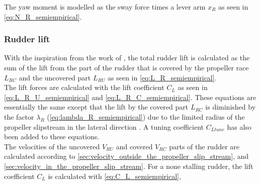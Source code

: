 The yaw moment is modelled as the sway force times a lever arm $x_R$ as seen in \autoref{eq:N_R_semiempirical}.
\begin{equation}
    \label{eq:N_R_semiempirical}
    
\end{equation}
%
%
\subsubsection{Rudder lift}
\label{sec:rudder lift}
With the inspiration from the work of \citet{villa_numerical_2020}, the total rudder lift is calculated as the sum of the lift from the part of the rudder that is covered by the propeller race $L_{RC}$ and the uncovered part $L_{RU}$ as seen in \autoref{eq:L_R_semiempirical}.
\begin{equation}
    \label{eq:L_R_semiempirical}
    
\end{equation}
The lift forces are calculated with the lift coefficient $C_L$ as seen in \autoref{eq:L_R_U_semiempirical} and \autoref{eq:L_R_C_semiempirical}. These equations are essentially the same except that the lift by the covered part $L_{RC}$ is diminished by the factor $\lambda_R$ (\autoref{eq:lambda_R_semiempirical}) due to the limited radius of the propeller slipstream in the lateral direction \citep{brix_manoeuvring_1993}. A tuning coefficient $C_{Ltune}$ has also been added to these equations.
\begin{equation}
    \label{eq:L_R_U_semiempirical}
    
\end{equation}
%
\begin{equation}
    \label{eq:L_R_C_semiempirical}
    
\end{equation}
The velocities of the uncovered $V_{RU}$ and covered $V_{RC}$ parts of the rudder are calculated according to \ref{sec:velocity_outside_the_propeller_slip_stream}, and \ref{sec:velocity_in_the_propeller_slip_stream}.
For a none stalling rudder, the lift coefficient $C_L$ is calculated with \autoref{eq:C_L_semiempirical},
\begin{equation}
    \label{eq:C_L_semiempirical}
    
\end{equation}
%
\begin{equation}
    \label{eq:alpha_semiempirical}
    
\end{equation}
